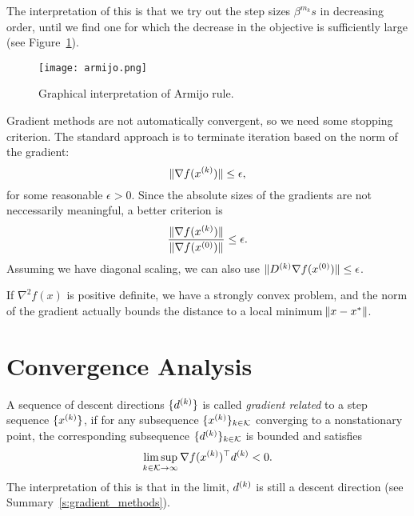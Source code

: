 \documentclass{article}
\begin{document}
The interpretation of this is that we try out the step sizes \(\beta^{m_k} s\) in decreasing order,
until we find one for which the decrease in the objective is sufficiently large (see
Figure~\ref{fig:armijo}).

\begin{figure}[h]
  \centering
  \texttt{[image: armijo.png]}
  \caption{Graphical interpretation of Armijo rule.\label{fig:armijo}}
\end{figure}



Gradient methods are not automatically convergent, so we need some stopping criterion.  The standard
approach is to terminate iteration based on the norm of the gradient:
\begin{equation*}
  \lVert \nabla f(\kth{x}) \rVert \leq \epsilon,
\end{equation*}
for some reasonable \(\epsilon > 0\).  Since the absolute sizes of the gradients are not
neccessarily meaningful, a better criterion is
\begin{equation*}
  \frac{\lVert \nabla f(\kth{x}) \rVert}{\lVert \nabla f(\kth[0]{x}) \rVert} \leq \epsilon.
\end{equation*}
Assuming we have diagonal scaling, we can also use
\(\lVert \kth{D} \nabla f(\kth[0]{x}) \rVert \leq \epsilon\).

If \(\nabla^2 f(x)\) is positive definite, we have a strongly convex problem, and the norm of the
gradient actually bounds the distance to a local minimum \(\enVert{x - x^*}\).


\section{Convergence Analysis}

\label{s:gradient_related_condition}

A sequence of descent directions \(\{\kth{d}\}\) is called \emph{gradient related} to a step
sequence \(\{\kth{x}\}\), if for any subsequence \(\{\kth{x}\}_{k \in \mathcal{K}}\) converging to a
nonstationary point, the corresponding subsequence \(\{\kth{d}\}_{k \in \mathcal{K}}\) is bounded
and satisfies
\begin{equation*}
  \limsup_{k \in \mathcal{K} \to \infty} \T{\nabla f(\kth{x})} \kth{d} < 0.
\end{equation*}
The interpretation of this is that in the limit, \(\kth{d}\) is still a descent direction (see
Summary~\ref{s:gradient_methods}).
\end{document}
